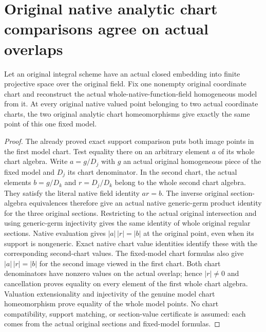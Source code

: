 \section{Original native analytic chart comparisons agree on actual overlaps}
\label{sec:projective-fixed-native-analytic-overlap}

\begin{theorem}
\label{thm:projective-fixed-native-analytic-overlap}
\leanok
{}
Let an original integral scheme have an actual closed embedding into finite
projective space over the original field. Fix one nonempty original
coordinate chart and reconstruct the actual whole-native-function-field
homogeneous model from it. At every original native valued point belonging
to two actual coordinate charts, the two original analytic chart
homeomorphisms give exactly the same point of this one fixed model.
\end{theorem}
\begin{proof}
The already proved exact support comparison puts both image points in the
first model chart. Test equality there on an arbitrary element $a$ of its
whole chart algebra. Write $a=g/D_j$ with $g$ an actual original homogeneous
piece of the fixed model and $D_j$ its chart denominator. In the second chart,
the actual elements $b=g/D_k$ and $r=D_j/D_k$ belong to the whole second chart
algebra. They satisfy the literal native field identity $ar=b$.
The inverse original section-algebra equivalences therefore give an actual
native generic-germ product identity for the three original sections.
Restricting to the actual original intersection and using generic-germ
injectivity gives the same identity of whole original regular sections.
Native evaluation gives $|a|\,|r|=|b|$ at the original point, even when its
support is nongeneric. Exact native chart value identities identify these
with the corresponding second-chart values. The fixed-model chart formulas
also give $|a|\,|r|=|b|$ for the second image viewed in the first chart.
Both chart denominators have nonzero values on the actual overlap; hence
$|r|\ne0$ and cancellation proves equality on every element of the first
whole chart algebra. Valuation extensionality and injectivity of the genuine
model chart homeomorphism prove equality of the whole model points.
No chart compatibility, support matching, or section-value certificate is
assumed: each comes from the actual original sections and fixed-model formulas.
\end{proof}
